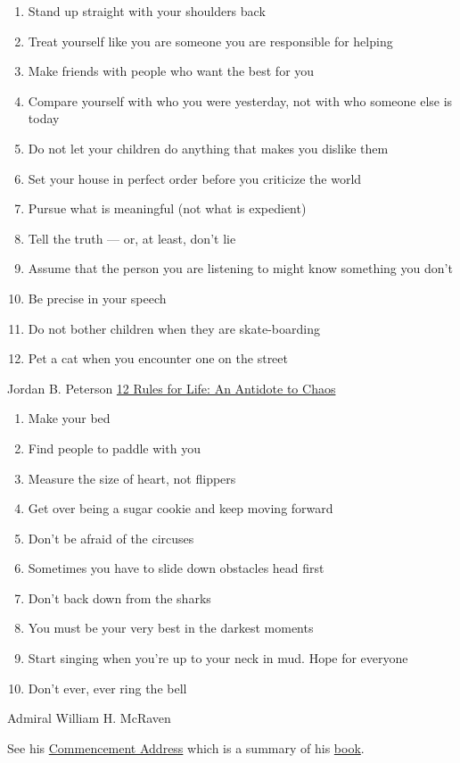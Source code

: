 \documentclass{article}
\begin{document}
\begin{minipage}[t]{0.45\textwidth}

\begin{enumerate}
    \item Stand up straight with your shoulders back
    \item Treat yourself like you are someone you are responsible for helping
    \item Make friends with people who want the best for you
    \item Compare yourself with who you were yesterday, not with who someone else is today
    \item Do not let your children do anything that makes you dislike them
    \item Set your house in perfect order before you criticize the world
    \item Pursue what is meaningful (not what is expedient)
    \item Tell the truth — or, at least, don’t lie
    \item Assume that the person you are listening to might know something you don’t
    \item Be precise in your speech
    \item Do not bother children when they are skate-boarding
    \item Pet a cat when you encounter one on the street
\end{enumerate}
Jordan B. Peterson
\href{https://www.goodreads.com/book/show/30257963-12-rules-for-life}{12 Rules for Life: An Antidote to Chaos}

\end{minipage}
\hfill
\begin{minipage}[t]{0.45\textwidth}

\begin{enumerate}
    \item Make your bed
    \item Find people to paddle with you
    \item Measure the size of heart, not flippers
    \item Get over being a sugar cookie and keep moving forward
    \item Don't be afraid of the circuses
    \item Sometimes you have to slide down obstacles head first
    \item Don't back down from the sharks
    \item You must be your very best in the darkest moments
    \item Start singing when you're up to your neck in mud.  Hope for everyone
    \item Don't ever, ever ring the bell
\end{enumerate}
Admiral William H. McRaven

See his \href{https://www.youtube.com/watch?v=pxBQLFLei70}{Commencement Address} which is a summary of his \href{https://www.goodreads.com/book/show/31423133-make-your-bed}{book}.

\end{minipage}
\end{document}
